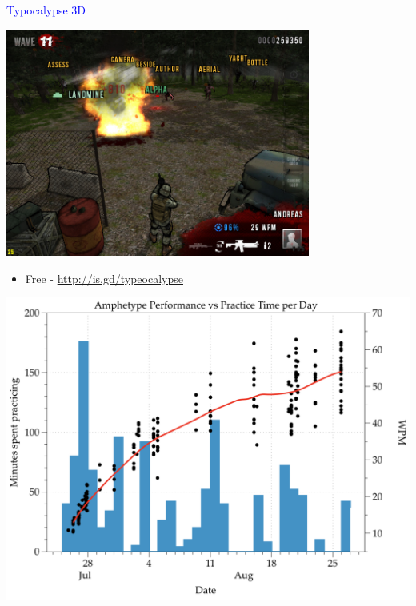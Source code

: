\documentclass[landscape]{slides}
\begin{document}
\begin{slide}

    \textcolor{blue}{\Large{Typocalypse 3D}}

    \centering

    \includegraphics[width=0.75\textwidth]{typocalypse-3d}

    \begin{itemize}
        \item Free - \url{http://is.gd/typeocalypse}
    \end{itemize}

\end{slide}


\begin{slide}

    \includegraphics[width=\textwidth]{amphetype}

\end{slide}
\end{document}
